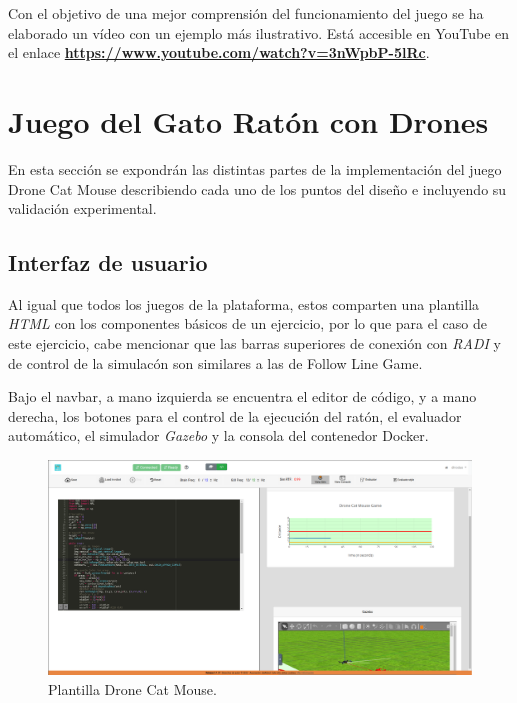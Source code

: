 \documentclass[a4paper, 12pt]{book}
\begin{document}
Con el objetivo de una mejor comprensión del funcionamiento del juego se ha elaborado un vídeo con un ejemplo más ilustrativo. Está accesible en YouTube en el enlace \textbf{\url{https://www.youtube.com/watch?v=3nWpbP-5lRc}}.

\section{Juego del Gato Ratón con Drones} 
\label{sec:drone_cat_mouse_game}

En esta sección se expondrán las distintas partes de la implementación del juego Drone Cat Mouse describiendo cada uno de los puntos del diseño e incluyendo su validación experimental.

\subsection{Interfaz de usuario}
\label{drone_cat_mouse_interface}

Al igual que todos los juegos de la plataforma, estos comparten una plantilla \emph{HTML} con los componentes básicos de un ejercicio, por lo que para el caso de este ejercicio, cabe mencionar que las barras superiores de conexión con \emph{RADI} y de control de la simulacón son similares a las de Follow Line Game.

Bajo el navbar, a mano izquierda se encuentra el editor de código, y a mano derecha, los botones para el control de la ejecución del ratón, el evaluador automático, el simulador \emph{Gazebo} y la consola del contenedor Docker.


\begin{figure}[H]
	\centering
    \includegraphics[width=\textwidth]{img/drone_cat_mouse.png}
    \caption{Plantilla Drone Cat Mouse.}
    \label{figura:keyhandler}
\end{figure}
\end{document}
